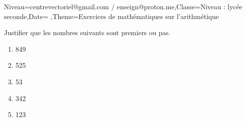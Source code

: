 \documentclass[a4paper,11pt,fleqn]{article}
\begin{document}
\begin{Maquette}[Fiche]{Niveau=centrevectoriel@gmail.com / enseign@proton.me,Classe=Niveau :  lycée seconde,Date=   ,Theme=Exercices de mathématiques  sur l'arithmétique }
\begin{exercice}
Justifier que les nombres suivants sont premiers ou pas.\begin{multicols}{2}
\begin{enumerate}[itemsep=2em]
	\item \begin{minipage}[t]{\linewidth} 849 \end{minipage}
	\item \begin{minipage}[t]{\linewidth} 525 \end{minipage}
	\item \begin{minipage}[t]{\linewidth} 53 \end{minipage}
	\item \begin{minipage}[t]{\linewidth} 342 \end{minipage}
	\item \begin{minipage}[t]{\linewidth} 123 \end{minipage}
\end{enumerate}
\end{multicols}
\end{exercice}


\end{Maquette}
\end{document}
